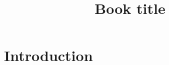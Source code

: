 \documentclass[10pt,twocolumn]{article}
\title{Book title}
\author{}
\date{}
\begin{document}
\maketitle

\begin{abstract}
\end{abstract}

\section{Introduction}



\end{document}
